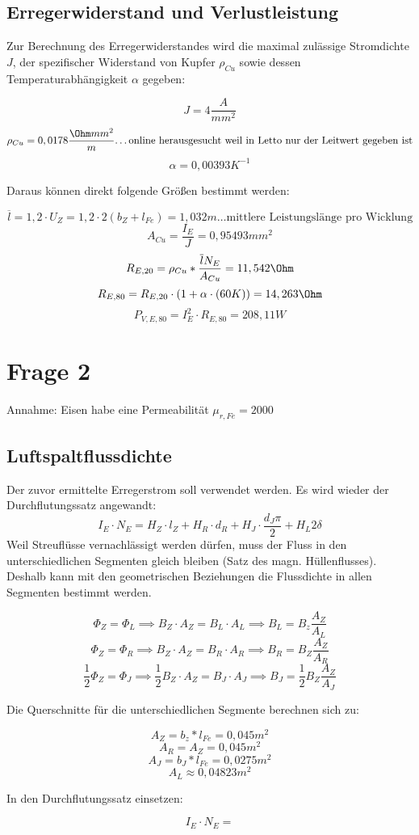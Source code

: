 \documentclass[a4paper]{article}
\begin{document}
    \subsection*{Erregerwiderstand und Verlustleistung}
    Zur Berechnung des Erregerwiderstandes wird die maximal zulässige Stromdichte $J$, der spezifischer Widerstand von Kupfer $\rho_{Cu}$ sowie dessen Temperaturabhängigkeit $\alpha$ gegeben:
    \begin{fleqn}[2em]
      \[ J=4 \frac{A}{mm^2}\]
      \[ \rho_{Cu}=0,0178 \frac{\Ohm mm^2}{m} \text{\ldots online herausgesucht weil in Letto nur der Leitwert gegeben ist}\]
      \[ \alpha = 0,00393 K^{-1}\]
    \end{fleqn}
    Daraus können direkt folgende Größen bestimmt werden:
    \begin{fleqn}[2em]    
    \[ \overline{l}=1,2\cdot U_{Z}=1,2\cdot 2(b_{Z}+l_{Fe})=1,032m \text{\ldots mittlere Leistungslänge pro Wicklung} \]
    \[ A_{Cu}=\frac{I_{E}}{J} = 0,95493mm^2 \]
    \[ R_{E,20} =\rho_{Cu}*\frac{\overline{l}N_{E}}{A_{Cu}}=11,542\Ohm\]
    \[ R_{E,80}=R_{E,20}\cdot (1+\alpha\cdot (60K))=14,263\Ohm\]
    \[ P_{V,E,80}=I_{E}^2\cdot R_{E,80}=208,11 W\]
    \end{fleqn}

    \section*{Frage 2}
    Annahme: Eisen habe eine Permeabilität $\mu_{r,Fe}=2000$

    \subsection*{Luftspaltflussdichte}
    Der zuvor ermittelte Erregerstrom soll verwendet werden. Es wird wieder der Durchflutungssatz angewandt:
    \[I_{E}\cdot N_{E}=H_{Z}\cdot l_{Z}+H_{R}\cdot d_{R}+H_{J}\cdot \frac{d_{J}\pi}{2}+H_{L}2\delta\]
    Weil Streuflüsse vernachlässigt werden dürfen, muss der Fluss in den unterschiedlichen Segmenten gleich bleiben (Satz des magn. Hüllenflusses). Deshalb kann mit den geometrischen Beziehungen die Flussdichte in allen Segmenten bestimmt werden.
    \begin{fleqn}[2em]
        \[ \Phi_{Z}=\Phi_{L} \implies B_{Z}\cdot A_{Z}=B_{L}\cdot A_{L} \implies B_{L}=B_{z} \frac{A_{Z}}{A_{L}} \]
        \[ \Phi_{Z}=\Phi_{R} \implies B_{Z}\cdot A_{Z}=B_{R}\cdot A_{R}\implies B_{R}=B_{Z} \frac{A_{Z}}{A_{R}} \]
        \[ \frac{1}{2}\Phi_{Z}=\Phi_{J} \implies \frac{1}{2}B_{Z}\cdot A_{Z}=B_{J}\cdot A_{J}\implies B_{J}=\frac{1}{2}B_{Z}\frac{A_{Z}}{A_{J}}\]
    \end{fleqn}
    Die Querschnitte für die unterschiedlichen Segmente berechnen sich zu:
    \begin{fleqn}[2em]
        \[ A_{Z}= b_{z}*l_{Fe}=0,045 m^2\]
        \[ A_{R}=A_{Z} = 0,045 m^2\]
        \[ A_{J}=b_{J}*l_{Fe}=0,0275 m^2 \]
        \[ A_{L}\approx0,04823 m^2 \]
    \end{fleqn}
    In den Durchflutungssatz einsetzen:
    \begin{fleqn}[2em]
        \[ I_{E}\cdot N_{E}= \]
        
    \end{fleqn}
\end{document}
